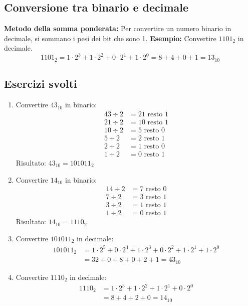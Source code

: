 \documentclass[12pt,a4paper]{article}
\begin{document}
\subsection{Conversione tra binario e decimale}
\textbf{Metodo della somma ponderata:}
Per convertire un numero binario in decimale, si sommano i pesi dei bit che sono 1.
\textbf{Esempio:} Convertire $1101_2$ in decimale.
\[1101_2 = 1 \cdot 2^3 + 1 \cdot 2^2 + 0 \cdot 2^1 + 1 \cdot 2^0 = 8 + 4 + 0 + 1 = 13_{10}\]

\subsection{Esercizi svolti}
\begin{enumerate}
\item Convertire $43_{10}$ in binario:
\begin{align*}
43 \div 2 &= 21 \text{ resto } 1 \\
21 \div 2 &= 10 \text{ resto } 1 \\
10 \div 2 &= 5 \text{ resto } 0 \\
5 \div 2 &= 2 \text{ resto } 1 \\
2 \div 2 &= 1 \text{ resto } 0 \\
1 \div 2 &= 0 \text{ resto } 1
\end{align*}
Risultato: $43_{10} = 101011_2$

\item Convertire $14_{10}$ in binario:
\begin{align*}
14 \div 2 &= 7 \text{ resto } 0 \\
7 \div 2 &= 3 \text{ resto } 1 \\
3 \div 2 &= 1 \text{ resto } 1 \\
1 \div 2 &= 0 \text{ resto } 1
\end{align*}
Risultato: $14_{10} = 1110_2$

\item Convertire $101011_2$ in decimale:
\begin{align*}
101011_2 &= 1 \cdot 2^5 + 0 \cdot 2^4 + 1 \cdot 2^3 + 0 \cdot 2^2 + 1 \cdot 2^1 + 1 \cdot 2^0 \\ 
&= 32 + 0 + 8 + 0 + 2 + 1 = 43_{10}
\end{align*}

\item Convertire $1110_2$ in decimale:
\begin{align*}
1110_2 &= 1 \cdot 2^3 + 1 \cdot 2^2 + 1 \cdot 2^1 + 0 \cdot 2^0 \\
&= 8 + 4 + 2 + 0 = 14_{10}
\end{align*}
\end{enumerate}
\end{document}
